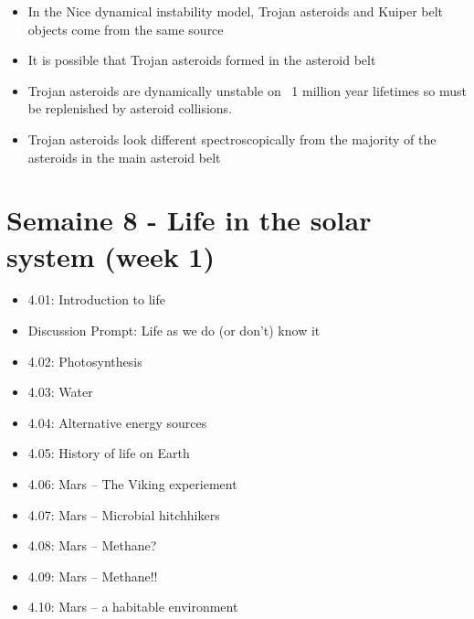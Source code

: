\begin{enumerate}
    \begin{multicols}{2} \begin{itemize}[label={$\bullet$}]
        \item In the Nice dynamical instability model, Trojan asteroids and Kuiper belt objects come from the same source
        \item It is possible that Trojan asteroids formed in the asteroid belt
        \item Trojan asteroids are dynamically unstable on ~1 million year lifetimes so must be replenished by asteroid collisions.
        \item Trojan asteroids look different spectroscopically from the majority of the asteroids in the main asteroid belt
    \end{itemize}\end{multicols}
\end{enumerate}


\newpage 

\section*{Semaine 8 - Life in the solar system (week 1)}

\begin{itemize}[label={$\bullet$}]
    \item 4.01: Introduction to life
    \item Discussion Prompt: Life as we do (or don't) know it
    \item 4.02: Photosynthesis
    \item 4.03: Water
    \item 4.04: Alternative energy sources
    \item 4.05: History of life on Earth
    \item 4.06: Mars -- The Viking experiement
    \item 4.07: Mars -- Microbial hitchhikers
    \item 4.08: Mars -- Methane?
    \item 4.09: Mars -- Methane!!
    \item 4.10: Mars -- a habitable environment
\end{itemize}

\newpage 

